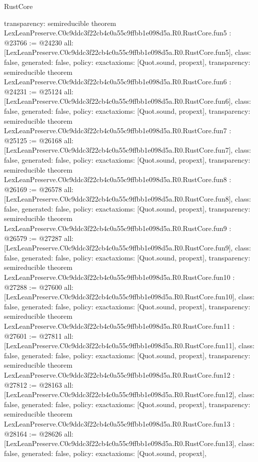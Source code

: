 \begin{lexlean}{RustCore}
\begin{coremodule}
{  transparency: semireducible
}
theorem LexLeanPreserve.C0c9ddc3f22cb4c0a55c9ffbb1e098d5a.R0.RustCore.fun5 : @23766 := @24230 {
  all: [LexLeanPreserve.C0c9ddc3f22cb4c0a55c9ffbb1e098d5a.R0.RustCore.fun5],
  class: false,
  generated: false,
  policy: exact{axioms: [Quot.sound, propext]},
  transparency: semireducible
}
theorem LexLeanPreserve.C0c9ddc3f22cb4c0a55c9ffbb1e098d5a.R0.RustCore.fun6 : @24231 := @25124 {
  all: [LexLeanPreserve.C0c9ddc3f22cb4c0a55c9ffbb1e098d5a.R0.RustCore.fun6],
  class: false,
  generated: false,
  policy: exact{axioms: [Quot.sound, propext]},
  transparency: semireducible
}
theorem LexLeanPreserve.C0c9ddc3f22cb4c0a55c9ffbb1e098d5a.R0.RustCore.fun7 : @25125 := @26168 {
  all: [LexLeanPreserve.C0c9ddc3f22cb4c0a55c9ffbb1e098d5a.R0.RustCore.fun7],
  class: false,
  generated: false,
  policy: exact{axioms: [Quot.sound, propext]},
  transparency: semireducible
}
theorem LexLeanPreserve.C0c9ddc3f22cb4c0a55c9ffbb1e098d5a.R0.RustCore.fun8 : @26169 := @26578 {
  all: [LexLeanPreserve.C0c9ddc3f22cb4c0a55c9ffbb1e098d5a.R0.RustCore.fun8],
  class: false,
  generated: false,
  policy: exact{axioms: [Quot.sound, propext]},
  transparency: semireducible
}
theorem LexLeanPreserve.C0c9ddc3f22cb4c0a55c9ffbb1e098d5a.R0.RustCore.fun9 : @26579 := @27287 {
  all: [LexLeanPreserve.C0c9ddc3f22cb4c0a55c9ffbb1e098d5a.R0.RustCore.fun9],
  class: false,
  generated: false,
  policy: exact{axioms: [Quot.sound, propext]},
  transparency: semireducible
}
theorem LexLeanPreserve.C0c9ddc3f22cb4c0a55c9ffbb1e098d5a.R0.RustCore.fun10 : @27288 := @27600 {
  all: [LexLeanPreserve.C0c9ddc3f22cb4c0a55c9ffbb1e098d5a.R0.RustCore.fun10],
  class: false,
  generated: false,
  policy: exact{axioms: [Quot.sound, propext]},
  transparency: semireducible
}
theorem LexLeanPreserve.C0c9ddc3f22cb4c0a55c9ffbb1e098d5a.R0.RustCore.fun11 : @27601 := @27811 {
  all: [LexLeanPreserve.C0c9ddc3f22cb4c0a55c9ffbb1e098d5a.R0.RustCore.fun11],
  class: false,
  generated: false,
  policy: exact{axioms: [Quot.sound, propext]},
  transparency: semireducible
}
theorem LexLeanPreserve.C0c9ddc3f22cb4c0a55c9ffbb1e098d5a.R0.RustCore.fun12 : @27812 := @28163 {
  all: [LexLeanPreserve.C0c9ddc3f22cb4c0a55c9ffbb1e098d5a.R0.RustCore.fun12],
  class: false,
  generated: false,
  policy: exact{axioms: [Quot.sound, propext]},
  transparency: semireducible
}
theorem LexLeanPreserve.C0c9ddc3f22cb4c0a55c9ffbb1e098d5a.R0.RustCore.fun13 : @28164 := @28626 {
  all: [LexLeanPreserve.C0c9ddc3f22cb4c0a55c9ffbb1e098d5a.R0.RustCore.fun13],
  class: false,
  generated: false,
  policy: exact{axioms: [Quot.sound, propext]},
}
\end{coremodule}
\end{lexlean}
